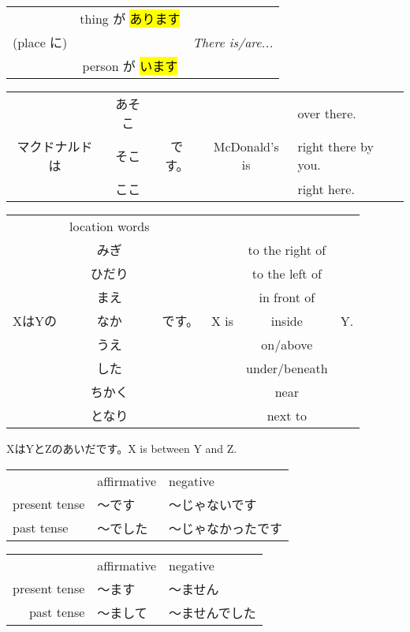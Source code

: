     {
    \begin{tabular}{r|c|l}
               &  thing が \hl{あります} \\
    (place に) &                         & \textit{There is/are...} \\
               &  person が \hl{います}
    \end{tabular}
    }

    {
    \begin{tabular}{c|c|cc|l}
                       & あそこ &       &               & over there. \\
        マクドナルドは & そこ   & です。& McDonald's is & right there by you. \\
                       & ここ   &       &               & right here.
    \end{tabular} 
    
    \begin{tabular}{c|c|cc|c|c}
               & location words \\
               & みぎ          &&      & to the right of \\
               & ひだり        &&      & to the left of \\
               & まえ          &&      & in front of \\
        XはYの & なか & です。  & X is & inside              & Y. \\
               & うえ          &&      & on/above \\
               & した          &&      & under/beneath \\
               & ちかく        &&      & near \\
               & となり        &&      & next to
    \end{tabular}
    
    XはYとZのあいだです。X is between Y and Z.
    }

    {
    \begin{tabular}{|lll|}
        \hline
                      & affirmative & negative \\
        present tense &  〜です     & 〜じゃないです \\
        past tense    &  〜でした   & 〜じゃなかったです \\
        \hline
    \end{tabular}
    }

    {
    \begin{tabular}{|rll|} 
        \hline
                      & affirmative & negative \\
        present tense & 〜ます      & 〜ません \\
        past tense    & 〜まして    & 〜ませんでした \\
        \hline
    \end{tabular}
    }

